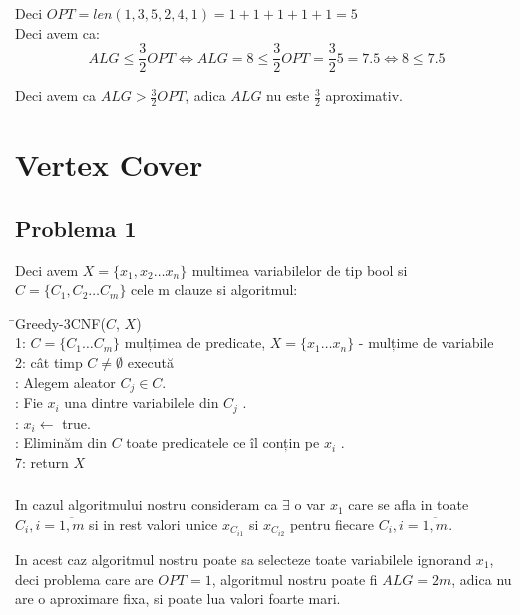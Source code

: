 \documentclass[a4paper]{report} %
\begin{document}
Deci $OPT=len(1,3,5,2,4,1)=1+1+1+1+1=5$\\

Deci avem ca:
\[ALG\leq \frac{3}{2}OPT \Leftrightarrow ALG=8\leq \frac{3}{2}OPT = \frac{3}{2}5 = 7.5 \Leftrightarrow 8\leq 7.5\]

Deci avem ca $ALG> \frac{3}{2}OPT$, adica $ALG$ nu este $\frac{3}{2}$ aproximativ.

\chapter*{Vertex Cover}
\setcounter{section}{0}

\section{Problema 1}

Deci avem $X=\{x_{1},x_{2}\dots x_{n}\}$ multimea variabilelor de tip bool si $C=\{C_{1},C_{2}\dots C_{m}\}$ cele m clauze si algoritmul:

\begin{tabbing}
\hspace{2em}
\= \kill Greedy-3CNF($C$, $X$)\\
1: $C=\{C_{1}\dots C_{m}\}$ mulțimea de predicate, $X=\{x_{1}\dots x_{n}\}$ - mulțime de variabile\\ 
2: cât timp $C\neq \emptyset$ execută\\ 
: Alegem aleator $C_{j}\in C$.\\
: Fie $x_{i}$ una dintre variabilele din $C_{j}$ .\\
: $x_{i}\leftarrow$ true.\\
: Eliminăm din $C$ toate predicatele ce îl conțin pe $x_{i}$ .\\
7: return $X$\\
\end{tabbing}


\subsection{}

In cazul algoritmului nostru consideram ca $\exists$ o var $x_{1}$ care se afla in toate $C_{i}, i=\overline{1,m}$ si in rest valori unice $x_{C_{i1}}$ si $x_{C_{i2}}$ pentru fiecare $C_{i}, i=\overline{1,m}$.

In acest caz algoritmul nostru poate sa selecteze toate variabilele ignorand $x_{1}$, deci problema care are $OPT=1$, algoritmul nostru poate fi $ALG=2m$, adica nu are o aproximare fixa, si poate lua valori foarte mari.\\
\end{document}
